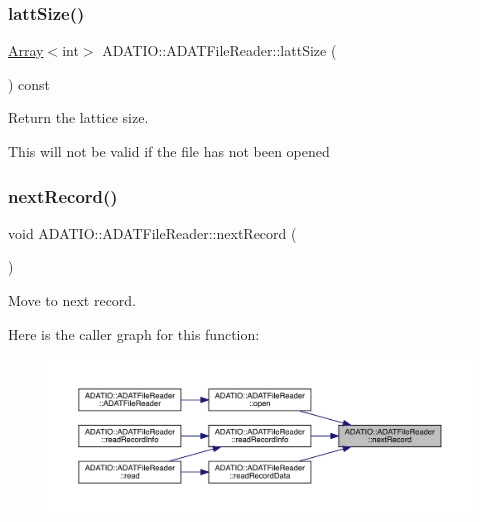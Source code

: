 \subsubsection{\texorpdfstring{lattSize()}{lattSize()}}
{\footnotesize\ttfamily \mbox{\hyperlink{classXMLArray_1_1Array}{Array}}$<$int$>$ A\+D\+A\+T\+I\+O\+::\+A\+D\+A\+T\+File\+Reader\+::latt\+Size (\begin{DoxyParamCaption}{ }\end{DoxyParamCaption}) const\hspace{0.3cm}{\ttfamily [inline]}}



Return the lattice size. 

This will not be valid if the file has not been opened \mbox{\label{group__qio_ga032651053fa6b2de6d3977f15862c48e}} 
\subsubsection{\texorpdfstring{nextRecord()}{nextRecord()}}
{\footnotesize\ttfamily void A\+D\+A\+T\+I\+O\+::\+A\+D\+A\+T\+File\+Reader\+::next\+Record (\begin{DoxyParamCaption}{ }\end{DoxyParamCaption})\hspace{0.3cm}{\ttfamily [protected]}}



Move to next record. 

Here is the caller graph for this function\+:
\nopagebreak
\begin{figure}[H]
\begin{center}
\leavevmode
\includegraphics[width=350pt]{db/de5/group__qio_ga032651053fa6b2de6d3977f15862c48e_icgraph}
\end{center}
\end{figure}
\mbox{\label{group__qio_ga2b2ac967129dfd2d61a79e36034b400f}} 
